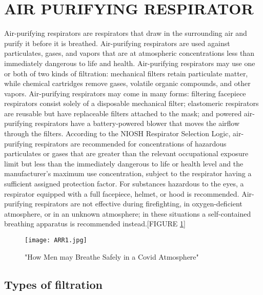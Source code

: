 \documentclass[12pt]{article}
\begin{document}
\section{AIR PURIFYING RESPIRATOR}
Air-purifying respirators are respirators that draw in the surrounding air and purify it before it is breathed.
Air-purifying respirators are used against particulates, gases, and vapors that are at atmospheric concentrations less than immediately dangerous to life and health.
Air-purifying respirators may use one or both of two kinds of filtration: mechanical filters retain particulate matter, while chemical cartridges remove gases, volatile organic compounds, and other vapors.
Air-purifying respirators may come in many forms: filtering facepiece respirators consist solely of a disposable mechanical filter; elastomeric respirators are reusable but have replaceable filters attached to the mask; and powered air-purifying respirators have a battery-powered blower that moves the airflow through the filters.
According to the NIOSH Respirator Selection Logic, air-purifying respirators are recommended for concentrations of hazardous particulates or gases that are greater than the relevant occupational exposure limit but less than the immediately dangerous to life or health level and the manufacturer's maximum use concentration, subject to the respirator having a sufficient assigned protection factor.
For substances hazardous to the eyes, a respirator equipped with a full facepiece, helmet, or hood is recommended.
Air-purifying respirators are not effective during firefighting, in oxygen-deficient atmosphere, or in an unknown atmosphere; in these situations a self-contained breathing apparatus is recommended instead.[FIGURE \ref{fig_ARR1}]
\begin{figure}[h]
\centering
\texttt{[image: ARR1.jpg]}
\caption{"How  Men may Breathe Safely in a Covid Atmosphere"}
\label{fig_ARR1}
\end{figure}
\subsection{Types of filtration}
\end{document}
